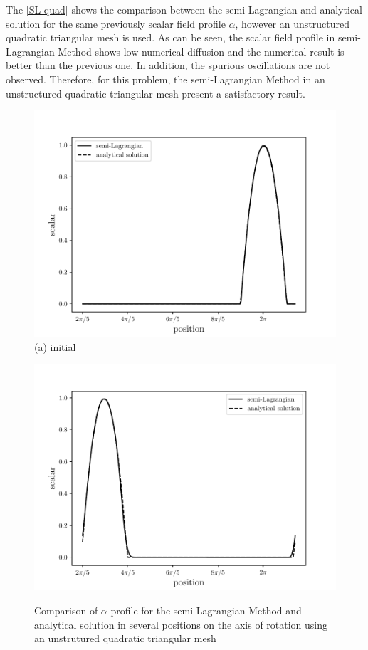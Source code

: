 \medskip
The \ref{SL quad} shows the 
comparison between the semi-Lagrangian and analytical solution
for the same previously scalar field
profile $\alpha$,
however an unstructured quadratic triangular mesh is used.
As can be seen, the scalar field profile in semi-Lagrangian Method
shows low numerical diffusion and 
the numerical result is better than the previous one.
In addition, the spurious oscillations are not observed.
Therefore, for this problem,
the semi-Lagrangian Method in an unstructured quadratic triangular mesh
present a satisfactory result.


\begin{center}
\begin{figure}[H]
     \caption{Comparison of $\alpha$ profile for the semi-Lagrangian Method and analytical solution in several positions on the axis of rotation using an unstrutured quadratic triangular mesh} 
     \centering
     \begin{minipage}{.5\linewidth}
      \centering
      \includegraphics[scale=0.53]{./02_chaps/cap_validation/figure/SLquad0.pdf}\\
      (a) initial
     \end{minipage}%
     \begin{minipage}{.5\linewidth}
      \centering
      \includegraphics[scale=0.53]{./02_chaps/cap_validation/figure/SLquad1.pdf}\\

\end{minipage}
\end{figure}
\end{center}
